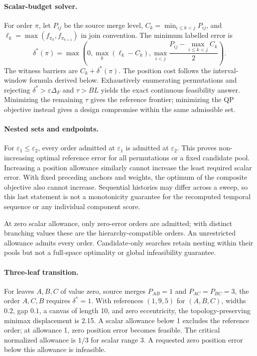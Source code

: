 \paragraph{Scalar-budget solver.}
For order $\pi$, let $P_{ij}$ be the source merge level, $C_k=\min_{i\le k<j}P_{ij}$, and $\ell_k=\max(f_{\pi_k},f_{\pi_{k+1}})$ in join convention. The minimum labelled error is
\[
\delta^*(\pi)=\max\left(0,\max_k(\ell_k-C_k),\max_{i<j}\frac{P_{ij}-\max_{i\le k<j}C_k}{2}\right).
\]
The witness barriers are $C_k+\delta^*(\pi)$. The position cost follows the interval-window formula derived below. Exhaustively enumerating permutations and rejecting $\delta^*>\varepsilon\Delta_F$ and $\tau>BL$ yields the exact continuous feasibility answer. Minimizing the remaining $\tau$ gives the reference frontier; minimizing the QP objective instead gives a design compromise within the same admissible set.

\paragraph{Nested sets and endpoints.}
For $\varepsilon_1\le\varepsilon_2$, every order admitted at $\varepsilon_1$ is admitted at $\varepsilon_2$. This proves non-increasing optimal reference error for all permutations or a fixed candidate pool. Increasing a position allowance similarly cannot increase the least required scalar error. With fixed preceding anchors and weights, the optimum of the composite objective also cannot increase. Sequential histories may differ across a sweep, so this last statement is not a monotonicity guarantee for the recomputed temporal sequence or any individual component score.

At zero scalar allowance, only zero-error orders are admitted; with distinct branching values these are the hierarchy-compatible orders. An unrestricted allowance admits every order. Candidate-only searches retain nesting within their pools but not a full-space optimality or global infeasibility guarantee.

\paragraph{Three-leaf transition.}
For leaves $A,B,C$ of value zero, source merges $P_{AB}=1$ and $P_{AC}=P_{BC}=3$, the order $A,C,B$ requires $\delta^*=1$. With references $(1,9,5)$ for $(A,B,C)$, widths $0.2$, gap $0.1$, a canvas of length 10, and zero eccentricity, the topology-preserving minimax displacement is 2.15. A scalar allowance below 1 excludes the reference order; at allowance 1, zero position error becomes feasible. The critical normalized allowance is $1/3$ for scalar range 3. A requested zero position error below this allowance is infeasible.


